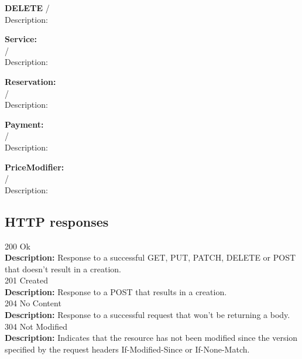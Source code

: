 \documentclass[11pt,a4paper,pdftex]{article}
\begin{document}
\hspace*{1em}\textbf{DELETE} /\\
\hspace*{2em}Description: 

\textbf{Service:}\\
\hspace*{1em}\textbf{ } /\\
\hspace*{2em}Description: 

\textbf{Reservation:}\\
\hspace*{1em}\textbf{ } /\\
\hspace*{2em}Description: 

\textbf{Payment:}\\
\hspace*{1em}\textbf{ } /\\
\hspace*{2em}Description: 

\textbf{PriceModifier:}\\
\hspace*{1em}\textbf{ } /\\
\hspace*{2em}Description: 

\subsection{HTTP responses}
\hspace*{1em}200 Ok\\
\hspace*{2em}\textbf{Description:} Response to a successful GET, PUT, PATCH, DELETE or POST that doesn't result in a creation.\\
\hspace*{1em}201 Created\\
\hspace*{2em}\textbf{Description:} Response to a POST that results in a creation.\\
\hspace*{1em}204 No Content\\
\hspace*{2em}\textbf{Description:} Response to a successful request that won't be returning a body.\\
\hspace*{1em}304 Not Modified\\
\hspace*{2em}\textbf{Description:} Indicates that the resource has not been modified since the version specified by the request headers If-Modified-Since or If-None-Match.
\end{document}
